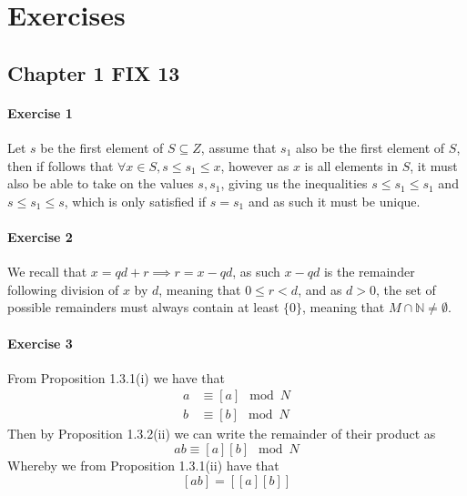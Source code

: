 \section{Exercises}
\subsection{Chapter 1 FIX 13}
\paragraph{Exercise 1}
Let $s$ be the first element of $S\subseteq Z$, assume that $s_{1}$ also be the first element of $S$, then if follows that $\forall x\in S,s\leq s_{1}\leq x$, however as $x$ is all elements in $S$, it must also be able to take on the values $s,s_{1}$, giving us the inequalities $s\leq s_{1}\leq s_{1}$ and $s\leq s_{1}\leq s$, which is only satisfied if $s=s_{1}$ and as such it must be unique.
\paragraph{Exercise 2}
We recall that $x=qd+r\implies r=x-qd$, as such $x-qd$ is the remainder following division of $x$ by $d$, meaning that $0\leq r<d$, and as $d>0$, the set of possible remainders must always contain at least $\{0\}$, meaning that $M\cap\mathbb{N}\neq\emptyset$.
\paragraph{Exercise 3}
From Proposition 1.3.1(i) we have that
\begin{align*}
    a&\equiv [a]\mod N \\
    b&\equiv[b]\mod N
\end{align*}
Then by Proposition 1.3.2(ii) we can write the remainder of their product as
\[
    ab\equiv[a][b]\mod N
\]
Whereby we from Proposition 1.3.1(ii) have that
\[
    [ab]=[[a][b]]
\]
